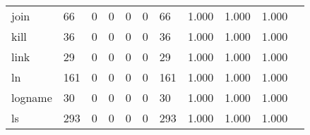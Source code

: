 \begin{longtable}{lp{1.2cm}p{1.2cm}p{1.2cm}p{1.2cm}p{1.2cm}p{1.2cm}p{1.2cm}p{1.2cm}p{1.2cm}p{1.2cm}}
join      &                                    66 &                                                  0 &                                                  0 &                                                  0 &                                                  0 &                                                 66 &                                         1.000 &                                              1.000 &                                              1.000 \\
kill      &                                    36 &                                                  0 &                                                  0 &                                                  0 &                                                  0 &                                                 36 &                                         1.000 &                                              1.000 &                                              1.000 \\
link      &                                    29 &                                                  0 &                                                  0 &                                                  0 &                                                  0 &                                                 29 &                                         1.000 &                                              1.000 &                                              1.000 \\
ln        &                                   161 &                                                  0 &                                                  0 &                                                  0 &                                                  0 &                                                161 &                                         1.000 &                                              1.000 &                                              1.000 \\
logname   &                                    30 &                                                  0 &                                                  0 &                                                  0 &                                                  0 &                                                 30 &                                         1.000 &                                              1.000 &                                              1.000 \\
ls        &                                   293 &                                                  0 &                                                  0 &                                                  0 &                                                  0 &                                                293 &                                         1.000 &                                              1.000 &                                              1.000 \\

\end{longtable}
